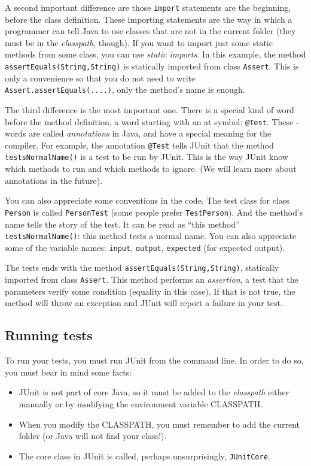 A second important difference are those \verb+import+ statements are
the beginning, before the class definition. These importing statements
are the way in which a programmer can tell Java to use classes that
are not in the current folder (they must be in the \emph{classpath},
though). If you want to import just some static methods from some
class, you can use \emph{static imports}. In this example, the method
\verb+assertEquals(String,String)+ is statically imported from class
\verb+Assert+. This is only a convenience so that you do not need to
write \verb+Assert.assertEquals(....)+, only the method's name is
enough. 

The third difference is the most important one. There is a special
kind of word before the method definition, a word starting with an at
symbol: \verb+@Test+. These \@-words are called \emph{annotations} in
Java, and have a special meaning for the compiler. For example, the
annotation \verb+@Test+ tells JUnit that the method
\verb+testsNormalName()+ is a test to be run by JUnit. This is the way
JUnit know which methods to run and which methods to ignore. (We will
learn more about annotations in the future).

You can also appreciate some conventions in the code. The test class
for class \verb+Person+ is called \verb+PersonTest+ (some people
prefer \verb+TestPerson+). And the method's name tells the story of
the test. It can be read as ``this method'' \verb+testsNormalName()+:
this method tests a normal name. You can also appreciate some of the
variable names: \verb+input+, \verb+output+, \verb+expected+ (for
expected output). 

The tests ends with the method \verb+assertEquals(String,String)+,
statically imported from class \verb+Assert+. This method performs an
\emph{assertion}, a test that the parameters verify some condition
(equality in this case). If that is not true, the method will throw an
exception and JUnit will report a failure in your test. 

\subsection{Running tests}
\label{sec:running-tests}

To run your tests, you must run JUnit from the command line. In order
to do so, you must bear in mind some facts: 

\begin{itemize}
\item JUnit is not part of core Java, so it must be added to the
  \emph{classpath} either manually or by modifying the environment
  variable CLASSPATH.
\item When you modify the CLASSPATH, you must remember to add the
  current folder (or Java will not find your class!).
\item The core class in JUnit is called, perhaps unsurprisingly,
  \verb+JUnitCore+. 
\end{itemize}

